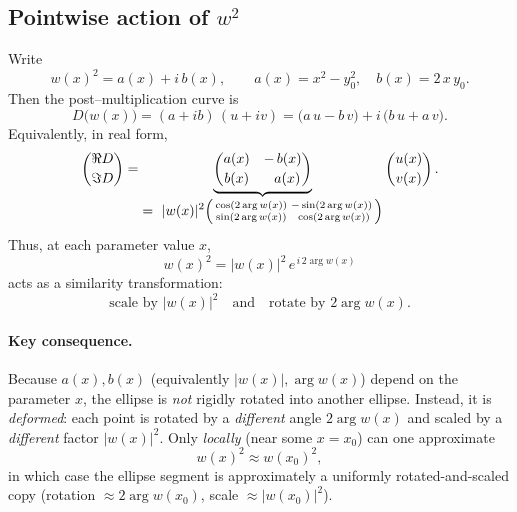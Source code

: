 \documentclass[12pt,a4paper]{article}
\begin{document}
\subsection*{Pointwise action of \(w^{2}\)}
Write
\[
w(x)^{2}=a(x)+i\,b(x),\qquad
a(x)=x^{2}-y_{0}^{2},\quad b(x)=2\,x\,y_{0}.
\]
Then the post–multiplication curve is
\[
D\bigl(w(x)\bigr)
=(a+ib)\,(u+iv)
=\bigl( a\,u - b\,v \bigr)
+ i\,\bigl( b\,u + a\,v \bigr).
\]
Equivalently, in real form,
\[
\begin{pmatrix}
	\Re D \\[2pt] \Im D
\end{pmatrix}
=
\underbrace{
	\begin{pmatrix}
		a(x) & -\,b(x)\\[2pt]
		b(x) & \ \ a(x)
\end{pmatrix}}_{\displaystyle =\ |w(x)|^{2}
	\begin{psmallmatrix}
		\cos(2\arg w(x)) & -\sin(2\arg w(x))\\
		\sin(2\arg w(x)) & \ \cos(2\arg w(x))
\end{psmallmatrix}}
\begin{pmatrix}
	u(x)\\[2pt] v(x)
\end{pmatrix}.
\]
Thus, at each parameter value \(x\),
\[
w(x)^{2}=|w(x)|^{2}\,e^{\,i\,2\arg w(x)}
\]
acts as a similarity transformation:
\[
\text{scale by }|w(x)|^{2}\quad\text{and}\quad
\text{rotate by }2\arg w(x).
\]

\paragraph{Key consequence.}
Because \(a(x),b(x)\) (equivalently \(|w(x)|,\arg w(x)\)) depend on the parameter \(x\), the ellipse is \emph{not} rigidly rotated into another ellipse. Instead, it is \emph{deformed}: each point is rotated by a \emph{different} angle \(2\arg w(x)\) and scaled by a \emph{different} factor \(|w(x)|^{2}\).
Only \emph{locally} (near some \(x=x_{0}\)) can one approximate
\[
w(x)^{2}\approx w(x_{0})^{2},
\]
in which case the ellipse segment is approximately a uniformly rotated-and-scaled copy (rotation \(\approx 2\arg w(x_{0})\), scale \(\approx |w(x_{0})|^{2}\)).
\end{document}
